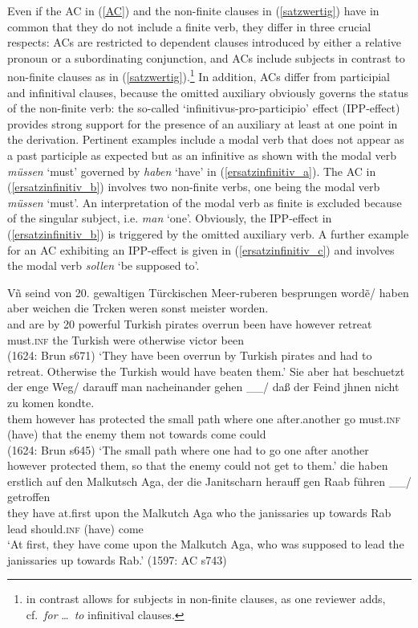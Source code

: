 \documentclass[output=paper,colorlinks,citecolor=brown]{langscibook}
\begin{document}
\noindent
Even if the AC in (\ref{AC}) and the non-finite clauses in (\ref{satzwertig}) have in common that
they do not include a finite verb, they differ in three crucial respects: ACs are restricted to
dependent clauses introduced by either a relative pronoun or a subordinating conjunction, and ACs
include subjects in contrast to non-finite clauses as in (\ref{satzwertig}).\footnote{ in
  contrast allows for subjects in non-finite clauses, as one reviewer adds, cf.\ \textit{for} \dots\
  \textit{to} infinitival clauses.} In addition, ACs differ from participial and infinitival
clauses, because the omitted auxiliary obviously governs the status of the non-finite verb: the
so-called `infinitivus-pro-participio' effect (IPP-effect) provides strong support for the presence
of an auxiliary at least at one point in the derivation. Pertinent examples include a modal verb
that does not appear as a past participle as expected but as an infinitive as shown with the modal
verb \textit{müssen} `must' governed by \textit{haben} `have' in (\ref{ersatzinfinitiv_a}). The AC
in (\ref{ersatzinfinitiv_b}) involves two non-finite verbs, one being the modal verb \textit{müssen}
`must'. An interpretation of the modal verb as finite is excluded because of the singular subject,
i.e. \textit{man} `one'. Obviously, the IPP-effect in (\ref{ersatzinfinitiv_b}) is triggered by the
omitted auxiliary verb. A further example for an AC exhibiting an IPP-effect is given in
(\ref{ersatzinfinitiv_c}) and involves the modal verb \textit{sollen} `be supposed to'.

\eal 
\ex \label{ersatzinfinitiv_a}
\gll Vñ seind von 20. gewaltigen Türckischen Meer-r\oldae{}uberen besprungen wordẽ/ haben aber weichen  die T\oldue{}rcken weren sonst meister worden.\\ and are by 20 powerful Turkish pirates overrun been have however retreat must.\textsc{inf} the Turkish were otherwise victor been \\ \hfill (1624: Brun s671)
\glt `They have been overrun by Turkish pirates and had to retreat. Otherwise the Turkish would have beaten them.'
\ex \label{ersatzinfinitiv_b}
\gll Sie aber hat beschuetzt der enge Weg/ darauff man nacheinander gehen  \_\_/ daß der Feind jhnen nicht zu komen kondte. \\ them however has protected the small path where one after.another go must.\textsc{inf} (have) that the enemy them not towards come could  \\ \hfill (1624: Brun s645)
\glt `The small path where one had to go one after another however protected them, so that the enemy could not get to them.'
\ex \label{ersatzinfinitiv_c}
\gll die haben erstlich auf den Malkutsch Aga, der die Janitscharn herauff gen Raab führen
\textbfemph{sollen} \_\_/ getroffen \\ they have at.first upon the Malkutch Aga who the janissaries up towards Rab lead should.\textsc{inf} (have) come \\ 
\glt `At first, they have come upon the Malkutch Aga, who was supposed to lead the janissaries up towards Rab.' \hfill (1597: AC s743)
\zl
\end{document}
